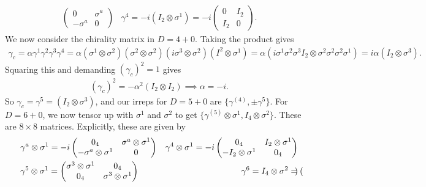 \documentclass[11pt]{article}
\begin{document}
\begin{eexample}
\begin{align*}
\begin{pmatrix}
            0 & \sigma^a\\
            - \sigma^a & 0
        \end{pmatrix}
        & \gamma^4 = -i(I_2 \otimes \sigma^1) = -i \begin{pmatrix}
            0 & I_2\\
            I_2 & 0
        \end{pmatrix}.
    \end{align*}
    We now consider the chirality matrix in $D = 4 + 0$.
    Taking the product gives
    \begin{align*}
        \gamma_c = \alpha \gamma^1 \gamma^2 \gamma^3 \gamma^4
        = \alpha (\sigma^{1} \otimes \sigma^{2})(\sigma^{2} \otimes \sigma^{2}) (i\sigma^{3} \otimes \sigma^{2})(I^{2} \otimes \sigma^{1})
        = \alpha (i \sigma^1 \sigma^2 \sigma^3 I_2 \otimes \sigma^2 \sigma^2 \sigma^2 \sigma^1)
        = i \alpha (I_2 \otimes \sigma^3).
    \end{align*}
    Squaring this and demanding $(\gamma_c)^2 = 1$ gives
    \begin{align*}
        (\gamma_c)^2 = - \alpha^2 (I_2 \otimes I_2) \implies \alpha = - i.
    \end{align*}
    So $\gamma_c = \gamma^5 = (I_2 \otimes \sigma^3)$, and our irreps
    for $D = 5 + 0$ are $\{ \gamma^{(4)}, \pm \gamma^5\}$.
    For $D = 6 + 0$, we now tensor up with $\sigma^1$ and $\sigma^2$ to get
    $\{ \gamma^{(5)} \otimes \sigma^1, I_4 \otimes \sigma^2 \}$.
    These are $8 \times 8$ matrices. Explicitly, these are given by
    \begin{align*}
        & \gamma^a \otimes \sigma^1 = -i \begin{pmatrix}
            0_4 & \sigma^a \otimes \sigma^1\\
            - \sigma^a \otimes \sigma^1 & 0
        \end{pmatrix}
        & \gamma^4 \otimes \sigma^1 = - i \begin{pmatrix}
            0_4 & I_2 \otimes \sigma^1\\
            - I_2 \otimes \sigma^1 & 0_4
        \end{pmatrix}\\
        & \gamma^5 \otimes \sigma^1 = \begin{pmatrix}
            \sigma^3 \otimes \sigma^1 & 0_4\\
            0_4 & \sigma^3 \otimes \sigma^1
        \end{pmatrix}
        & \gamma^6 = I_4 \otimes \sigma^2 = \begin{pmatrix}

\end{pmatrix}
\end{align*}
\end{eexample}
\end{document}
